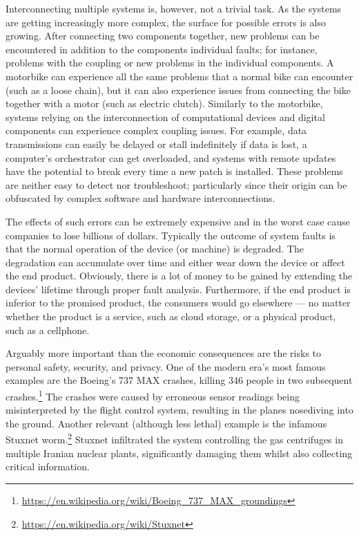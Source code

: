 Interconnecting multiple systems is, however, not a trivial task.
As the systems are getting increasingly more complex, the surface for possible errors is also growing.
After connecting two components together, new problems can be encountered in addition to the components individual faults; for instance, problems with the coupling or new problems in the individual components.
A motorbike can experience all the same problems that a normal bike can encounter (such as a loose chain), but it can also experience issues from connecting the bike together with a motor (such as electric clutch).
Similarly to the motorbike, systems relying on the interconnection of computational devices and digital components can experience complex coupling issues.
For example, data transmissions can easily be delayed or stall indefinitely if data is lost, a computer's orchestrator can get overloaded, and systems with remote updates have the potential to break every time a new patch is installed.
These problems are neither easy to detect nor troubleshoot; particularly since their origin can be obfuscated by complex software and hardware interconnections.

The effects of such errors can be extremely expensive and in the worst case cause companies to lose billions of dollars.
Typically the outcome of system faults is that the normal operation of the device (or machine) is degraded.
The degradation can accumulate over time and either wear down the device or affect the end product.
Obviously, there is a lot of money to be gained by extending the devices' lifetime through proper fault analysis.
Furthermore, if the end product is inferior to the promised product, the consumers would go elsewhere --- no matter whether the product is a service, such as cloud storage, or a physical product, such as a cellphone.

Arguably more important than the economic consequences are the risks to personal safety, security, and privacy.
One of the modern era's most famous examples are the Boeing's 737 MAX crashes, killing 346 people in two subsequent crashes.\footnote{\url{https://en.wikipedia.org/wiki/Boeing_737_MAX_groundings}}
The crashes were caused by erroneous sensor readings being misinterpreted by the flight control system, resulting in the planes nosediving into the ground.
Another relevant (although less lethal) example is the infamous Stuxnet worm.\footnote{\url{https://en.wikipedia.org/wiki/Stuxnet}}
Stuxnet infiltrated the system controlling the gas centrifuges in multiple Iranian nuclear plants, significantly damaging them whilst also collecting critical information. 

